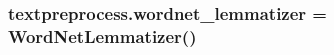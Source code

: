 \subsubsection[{\texorpdfstring{wordnet\+\_\+lemmatizer}{wordnet_lemmatizer}}]{\setlength{\rightskip}{0pt plus 5cm}textpreprocess.\+wordnet\+\_\+lemmatizer = Word\+Net\+Lemmatizer()}\hypertarget{namespacetextpreprocess_a24616b4e8776baa0d1acc010b36fd23e}{}\label{namespacetextpreprocess_a24616b4e8776baa0d1acc010b36fd23e}
